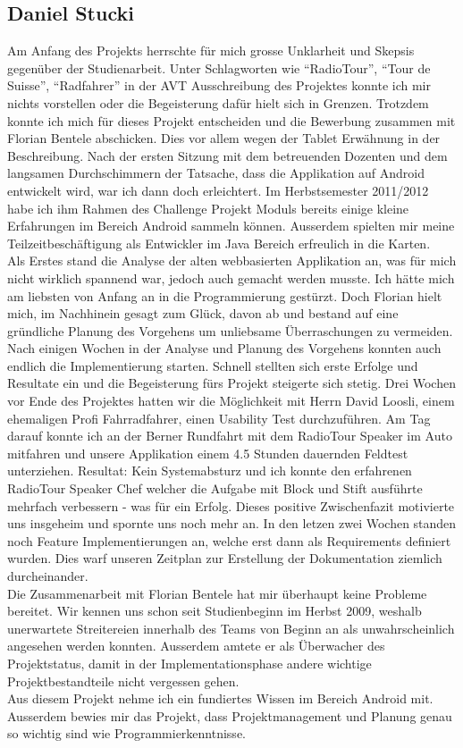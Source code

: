 \subsection{Daniel Stucki}
Am Anfang des Projekts herrschte für mich grosse Unklarheit und Skepsis gegenüber der Studienarbeit. Unter Schlagworten wie "`RadioTour"', "`Tour de Suisse"', "`Radfahrer"' in der AVT Ausschreibung des Projektes konnte ich mir nichts vorstellen oder die Begeisterung dafür hielt sich in Grenzen. Trotzdem konnte ich mich für dieses Projekt entscheiden und die Bewerbung zusammen mit Florian Bentele abschicken. Dies vor allem wegen der Tablet Erwähnung in der Beschreibung. Nach der ersten Sitzung mit dem betreuenden Dozenten und dem langsamen Durchschimmern der Tatsache, dass die Applikation auf Android entwickelt wird, war ich dann doch erleichtert. Im Herbstsemester 2011/2012 habe ich ihm Rahmen des Challenge Projekt Moduls bereits einige kleine Erfahrungen im Bereich Android sammeln können. Ausserdem spielten mir meine Teilzeitbeschäftigung als Entwickler im Java Bereich erfreulich in die Karten.
\\
Als Erstes stand die Analyse der alten webbasierten Applikation an, was für mich nicht wirklich spannend war, jedoch auch gemacht werden musste. Ich hätte mich am liebsten von Anfang an in die Programmierung gestürzt. Doch Florian hielt mich, im Nachhinein gesagt zum Glück, davon ab und bestand auf eine gründliche Planung des Vorgehens um unliebsame Überraschungen zu vermeiden. Nach einigen Wochen in der Analyse und Planung des Vorgehens konnten auch endlich die Implementierung starten. Schnell stellten sich erste Erfolge und Resultate ein und die Begeisterung fürs Projekt steigerte sich stetig. Drei Wochen vor Ende des Projektes hatten wir die Möglichkeit mit Herrn David Loosli, einem ehemaligen Profi Fahrradfahrer, einen Usability Test durchzuführen. Am Tag darauf konnte ich an der Berner Rundfahrt mit dem RadioTour Speaker im Auto mitfahren und unsere Applikation einem 4.5 Stunden dauernden Feldtest unterziehen. Resultat: Kein Systemabsturz und ich konnte den erfahrenen RadioTour Speaker Chef welcher die Aufgabe mit Block und Stift ausführte mehrfach verbessern - was für ein Erfolg. Dieses positive Zwischenfazit motivierte uns insgeheim und spornte uns noch mehr an. In den letzen zwei Wochen standen noch Feature Implementierungen an, welche erst dann als Requirements definiert wurden. Dies warf unseren Zeitplan zur Erstellung der Dokumentation ziemlich durcheinander.
\\
Die Zusammenarbeit mit Florian Bentele hat mir überhaupt keine Probleme bereitet. Wir kennen uns schon seit Studienbeginn im Herbst 2009, weshalb unerwartete Streitereien innerhalb des Teams von Beginn an als unwahrscheinlich angesehen werden konnten. Ausserdem amtete er als Überwacher des Projektstatus, damit in der Implementationsphase andere wichtige Projektbestandteile nicht vergessen gehen.
\\
Aus diesem Projekt nehme ich ein fundiertes Wissen im Bereich Android mit. Ausserdem bewies mir das Projekt, dass Projektmanagement und Planung genau so wichtig sind wie Programmierkenntnisse. 
